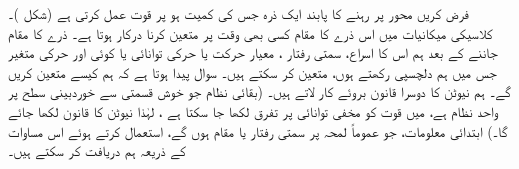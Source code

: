 فرض کریں محور  پر رہنے کا پابند ایک ذرہ جس کی کمیت  ہو پر قوت  عمل کرتی ہے (شکل )۔ کلاسیکی میکانیات میں اس ذرے کا مقام  کسی بھی وقت  پر متعین کرنا درکار ہوتا ہے۔ ذرے کا مقام جاننے کے بعد ہم اس کا اسراع، سمتی رفتار ، معیار حرکت  یا حرکی توانائی  یا کوئی اور حرکی متغیر جس میں ہم دلچسپی رکھتے ہوں، متعین کر سکتے ہیں۔ سوال پیدا ہوتا ہے کہ ہم  کیسے متعین کریں گے۔ ہم نیوٹن کا دوسرا قانون  بروئے کار لاتے ہیں۔ (بقائی نظام جو خوش قسمتی سے خوردبینی سطح پر واحد نظام ہے، میں قوت کو مخفی توانائی پر تفرق لکھا جا سکتا ہے ، لہٰذا نیوٹن کا قانون  لکھا جائے گا۔) ابتدائی معلومات، جو عموماً لمحہ  پر سمتی رفتار یا مقام ہوں گے، استعمال کرتے ہوئے اس مساوات کے ذریعہ ہم  دریافت کر سکتے ہیں۔
 
